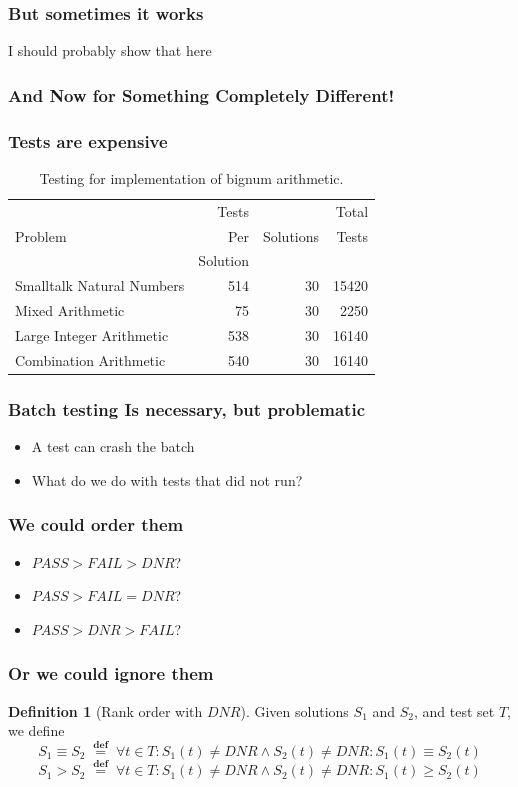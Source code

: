 \documentclass[svgnames]{beamer}
\newcommand\dnr{\ensuremath{\mathit{DNR}}}
\newcommand\fail{\mathit{FAIL}}
\newcommand\pass{\mathit{PASS}}
\newcommand\defined{\mathrel{\;\stackrel{\scriptscriptstyle\mathbf{def}}{=}\;}}
\theoremstyle{definition}
\newtheorem{defn}{Definition}
\begin{document}
\begin{frame}
\frametitle{But sometimes it works}
I should probably show that here
\end{frame}

\begin{frame}
\frametitle{And Now for Something Completely Different!}
\end{frame}

\begin{frame}
\frametitle{Tests are expensive}
\begin{table}
\begin{tabular}{| l | r | r | r |}
\hline
 & Tests & & Total \\
Problem & Per & Solutions & Tests \\
 & Solution & &  \\
\hline
Smalltalk Natural Numbers & 514 & 30 & 15420 \\
Mixed Arithmetic & 75 & 30 & 2250 \\
Large Integer Arithmetic & 538 & 30 & 16140 \\
Combination Arithmetic & 540 & 30 & 16140 \\
\hline
\end{tabular}
\caption{Testing for implementation of bignum arithmetic.}
\end{table}
\end{frame}

\begin{frame}
\frametitle{Batch testing Is necessary, but problematic}
\begin{itemize}
\item A test can crash the batch
\item What do we do with tests that did not run?
\end{itemize}
\end{frame}

\begin{frame}
\frametitle{We could order them}
\begin{itemize}
\item $\pass>\fail>\dnr$?
\item $\pass>\fail=\dnr$?
\item $\pass>\dnr>\fail$?
\end{itemize}
\end{frame}

\begin{frame}
\frametitle{Or we could ignore them}
\begin{defn}[Rank order with \dnr]
Given solutions $S_1$ and $S_2$, and test set $T$, we define
$$S_1 \equiv S_2 \defined \forall t \in T : S_1(t) \neq \dnr \wedge S_2(t) \neq \dnr : S_1(t) \equiv S_2(t)$$
$$S_1 > S_2 \defined \forall t \in T : S_1(t) \neq \dnr \wedge S_2(t) \neq \dnr : S_1(t) \geq S_2(t)$$
\end{defn}
\end{frame}
\end{document}
